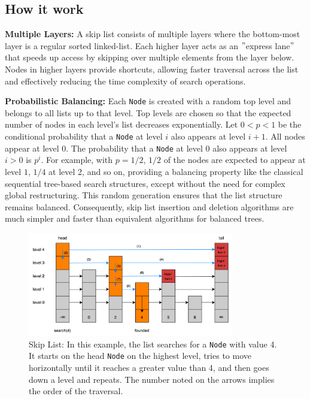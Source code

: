 \subsection*{How it work}\label{subsec:howitwork}

\textbf{Multiple Layers:} A skip list consists of multiple layers where the bottom-most layer is a regular sorted linked-list.
Each higher layer acts as an \("\)express lane\("\) that speeds up access by skipping over multiple elements from the layer below.
Nodes in higher layers provide shortcuts, allowing faster traversal across the list and effectively reducing the time complexity of search operations.

\textbf{Probabilistic Balancing:} Each \texttt{Node} is created with a random top level and belongs to all lists up to that level.
Top levels are chosen so that the expected number of nodes in each level's list decreases exponentially.
Let \(0 < p < 1\) be the conditional probability that a \texttt{Node} at level \(i\) also appears at level \(i + 1\).
All nodes appear at level \(0\).
The probability that a \texttt{Node} at level 0 also appears at level \(i > 0\) is \( p^i\).
For example, with \(p = 1/2\), \(1/2\) of the nodes are expected to appear at level \(1\), \(1/4\) at level 2, and so on, providing a balancing property like the classical sequential tree-based search structures, except without the need for complex global restructuring.
This random generation ensures that the list structure remains balanced.
Consequently, skip list insertion and deletion algorithms are much simpler and faster than equivalent algorithms for balanced trees.

\begin{figure}[hbt!]
    \centering
    \includegraphics[width=0.8\textwidth]{./figures/skiplistsearch.png}
    \caption{Skip List: In this example, the list searches for a \texttt{Node} with value 4. It starts on the head \texttt{Node} on the highest level, tries to move horizontally until it reaches a greater value than 4, and then goes down a level and repeats. The number noted on the arrows implies the order of the traversal.}
    \label{fig:skiplistsearch}
\end{figure}

